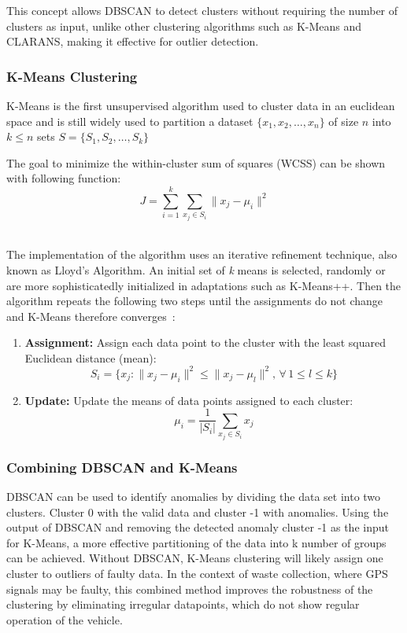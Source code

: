 \documentclass[a4paper,12pt,twoside]{scrreprt}
\begin{document}
This concept allows DBSCAN to detect clusters without
requiring the number of clusters as input, unlike other clustering algorithms
such as K-Means and CLARANS, making it effective for outlier detection.
\cite{ester_density-based_nodate}

\subsubsection{K-Means Clustering}
K-Means is the first unsupervised algorithm used to cluster data in an
euclidean space and is still widely used to partition a dataset
$ \{x_1, x_2, \dots, x_n\}$ of size
$n$ into $k \leq n$ sets $S = \{S_1, S_2, \dots, S_k\}$ \cite{sinaga_pdf_2024}

The goal to minimize the within-cluster sum of squares (WCSS) can be shown with
following function:
\[
  J = \sum_{i=1}^{k} \sum_{x_j \in S_i} \| x_j - \mu_i \|^2
\]~\cite{sinaga_pdf_2024}

The implementation of the algorithm uses an iterative refinement technique,
also known as Lloyd's Algorithm.
An initial set of \textit{k} means is selected, randomly or are more
sophisticatedly initialized in adaptations such as K-Means++.
Then the algorithm repeats the following two steps until the assignments do not
change and K-Means therefore converges~\cite{sinaga_pdf_2024}:

\begin{enumerate}
  \item \textbf{Assignment:} Assign each data point to the cluster with the
        least squared Euclidean distance (mean):
        \[
          S_i = \{x_j : \| x_j - \mu_i \|^2 \leq \| x_j - \mu_l \|^2, \,
          \forall \, 1
          \leq l \leq k\}
        \]
  \item \textbf{Update:} Update the means of data points assigned to each
        cluster:
        \[
          \mu_i = \frac{1}{|S_i|} \sum_{x_j \in S_i} x_j
        \]
\end{enumerate}

\subsubsection{Combining DBSCAN and K-Means}
DBSCAN can be used to identify anomalies by dividing the data set into two
clusters. Cluster 0 with the valid data and cluster -1 with anomalies. Using
the output of DBSCAN and removing the detected anomaly cluster -1 as the input
for K-Means, a more effective partitioning of the data into k number of groups
can be achieved.
Without DBSCAN, K-Means clustering will likely assign one cluster to outliers
of faulty data.
In the context of waste collection, where GPS signals may be faulty, this
combined method improves the robustness of the clustering by eliminating
irregular datapoints, which do not show regular operation of the vehicle.
\end{document}
